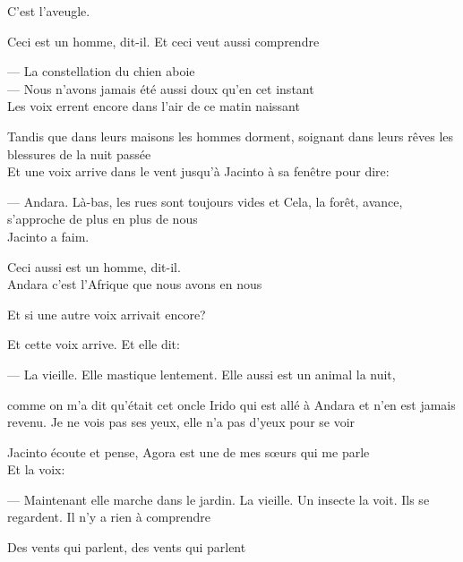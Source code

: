C'est l'aveugle.

Ceci est un homme, dit-il. Et ceci veut aussi comprendre

\pagebreak

\vspace*{4cm}

--- La constellation du chien aboie\\

--- Nous n'avons jamais été aussi doux qu'en cet instant\\

Les voix errent encore dans l'air de ce matin naissant

Tandis que dans leurs maisons les hommes dorment, soignant dans leurs
rêves les blessures de la nuit passée\\

Et une voix arrive dans le vent jusqu'à Jacinto à sa fenêtre pour dire:

--- Andara. Là-bas, les rues sont toujours vides et Cela, la forêt,
avance, s'approche de plus en plus de nous\\

Jacinto a faim.

Ceci aussi est un homme, dit-il.\\

Andara c'est l'Afrique que nous avons en nous

\pagebreak

\vspace*{4cm}

Et si une autre voix arrivait encore?

Et cette voix arrive. Et elle dit:

--- La vieille. Elle mastique lentement. Elle aussi est un animal la nuit,

comme on m'a dit qu'était cet oncle Irido qui est allé à Andara et n'en
est jamais revenu. Je ne vois pas ses yeux, elle n'a pas d'yeux pour se
voir

Jacinto écoute et pense, Agora est une de mes sœurs qui me parle\\	

Et la voix:

--- Maintenant elle marche dans le jardin. La vieille. Un insecte la voit.
Ils se regardent. Il n'y a rien à comprendre

\pagebreak

\vspace*{4cm}

Des vents qui parlent, des vents qui parlent\\


